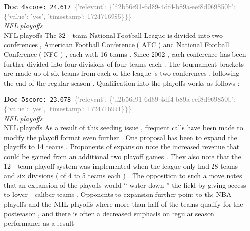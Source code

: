 \documentclass[a4paper,11pt]{article}
\begin{document}
\begin{docenv}
{\footnotesize\textcolor{doccolor}{\textbf{Doc~4}}}\hfill{\tiny\texttt{score:~24.617}}\ {\tiny\textcolor{gray}{\{'relevant': \{'d2b56e91-6d89-4df4-b89a-eef8d969850b': \{'value': 'yes', 'timestamp': 1724716985\}\}\}}}\\[3pt]
{\small\textit{NFL playoffs}}\\[2pt]
\vspace{2pt}
{\footnotesize NFL playoffs
The 32 - team National Football League is divided into two conferences , American Football Conference ( AFC ) and National Football Conference ( NFC ) , each with 16 teams . Since 2002 , each conference has been further divided into four divisions of four teams each . The tournament brackets are made up of six teams from each of the league 's two conferences , following the end of the regular season . Qualification into the playoffs works as follows :}
\end{docenv}
\begin{docenv}
{\footnotesize\textcolor{doccolor}{\textbf{Doc~5}}}\hfill{\tiny\texttt{score:~23.078}}\ {\tiny\textcolor{gray}{\{'relevant': \{'d2b56e91-6d89-4df4-b89a-eef8d969850b': \{'value': 'yes', 'timestamp': 1724716991\}\}\}}}\\[3pt]
{\small\textit{NFL playoffs}}\\[2pt]
\vspace{2pt}
{\footnotesize NFL playoffs
As a result of this seeding issue , frequent calls have been made to modify the playoff format even further . One proposal has been to expand the playoffs to 14 teams . Proponents of expansion note the increased revenue that could be gained from an additional two playoff games . They also note that the 12 - team playoff system was implemented when the league only had 28 teams and six divisions ( of 4 to 5 teams each ) . The opposition to such a move notes that an expansion of the playoffs would `` water down '' the field by giving access to lower - caliber teams . Opponents to expansion further point to the NBA playoffs and the NHL playoffs where more than half of the teams qualify for the postseason , and there is often a decreased emphasis on regular season performance as a result .}
\end{docenv}
\end{document}
